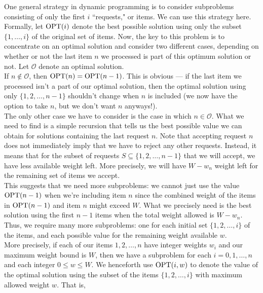 One general strategy in dynamic programming is to consider subproblems consisting of only the first $i$ ``requests," or items. We can use this strategy here. Formally, let $\operatorname{OPT}(i)$ denote the best possible solution using only the subset $\{1, \ldots, i\}$ of the original set of items. Now, the key to this problem is to concentrate on an optimal solution and consider two different cases, depending on whether or not the last item $n$ we processed is part of this optimum solution or not. Let $\mathcal{O}$ denote an optimal solution.\\


If $n \not \in \mathcal{O}$, then $\operatorname{OPT}(n) = \operatorname{OPT}(n - 1)$. This is obvious --- if the last item we processed isn't a part of our optimal solution, then the optimal solution using only $\{1, 2, \ldots, n - 1\}$ shouldn't change when $n$ is included (we now have the option to take $n$, but we don't want $n$ anyways!). \\


The only other case we have to consider is the case in which $n \in \mathcal{O}$. What we need to find is a simple recursion that tells us the best possible value we can obtain for solutions containing the last request $n$. Note that accepting request $n$ does not immediately imply that we have to reject any other requests. Instead, it means that for the subset of requests $S \subseteq \{1, 2, \ldots, n - 1\}$ that we will accept, we have less available weight left. More precisely, we will have $W - w_n$ weight left for the remaining set of items we accept. \\


This suggests that we need more subproblems: we cannot just use the value $\operatorname{OPT}(n - 1)$ when we're including item $n$ since the combined weight of the items in $\operatorname{OPT}(n - 1)$ and item $n$ might exceed $W$. What we precisely need is the best solution using the first $n - 1$ items when the total weight allowed is $W - w_n$. Thus, we require many more subproblems: one for each initial set $\{1, 2, \ldots, i\}$ of the items, and each possible value for the remaining weight available $w$. \\

More precisely, if each of our items $1, 2, \ldots, n$ have integer weights $w_i$ and our maximum weight bound is $W$, then we have a subproblem for each $i = 0, 1, \ldots, n$ and each integer $0 \leq w \leq W.$ We henceforth use $\operatorname{OPT}(i, w)$ to denote the value of the optimal solution using the subset of the items $\{1, 2, \ldots, i\}$ with maximum allowed weight $w$. That is,

